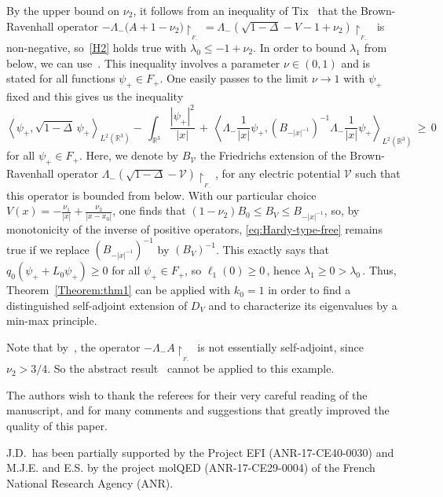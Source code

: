 \documentclass[12pt,reqno]{amsart}
\newcommand{\innerproduct}[2]{\left\langle #1, #2 \right\rangle}
\newcommand{\R}{{\mathbb R}}
\newcommand{\be}[1]{\begin{equation}\label{#1}}
\newcommand{\ee}{\end{equation}}
\renewcommand{\(}{\left(}
\renewcommand{\)}{\right)}
\begin{document}
By the upper bound on $\nu_2$, it follows from an inequality of Tix~\cite{MR1608118} that the Brown-Ravenhall operator $-\Lambda_- \big(A+1-\nu_2\big)\upharpoonright_{_{F_-}}=\Lambda_-(\sqrt{1-\Delta}-V-1+\nu_2)\upharpoonright_{_{F_-}}\,$ is non-negative, so~\eqref{H2} holds true with $\lambda_0\leq -1+\nu_2$. In order to bound $\lambda_1$ from below, we can use~\cite[inequality~(38)]{DES00a}. This inequality involves a parameter $\nu\in (0,1)$ and is stated for all functions $\psi_+\in F_+$. One easily passes to the limit $\nu\to 1$ with $\psi_+$ fixed and this gives us the inequality
\be{eq:Hardy-type-free}\innerproduct{\psi_+}{\sqrt{1-\Delta}\,\psi_+}_{L^2(\R^3)}-\,\int_{\R^3}\frac{|\psi_+|^2}{|x|}
\,+\,\innerproduct{\Lambda_-\frac{1}{|x|}\psi_+}{ \left(B_{-|x|^{-1}}\right)^{-1}\Lambda_-\frac{1}{|x|}\psi_+}_{L^2(\R^3)}\,\geq\,0
\ee
for all $\psi_+\in F_+$. Here, we denote by $B_{\mathcal V}$ the Friedrichs extension of the Brown-Ravenhall operator $\Lambda_-(\sqrt{1-\Delta}-\mathcal V)\upharpoonright_{_{F_-}}$, for any electric potential $\mathcal V$ such that this operator is bounded from below. With our particular choice $V(x)=-\frac{\nu_1}{|x|}+\frac{\nu_2}{|x-x_0|}$, one finds that $(1-\nu_2)B_0\leq B_{V}\leq B_{-|x|^{-1}}$, so, by monotonicity of the inverse of positive operators, \eqref{eq:Hardy-type-free} remains true if we replace $\left(B_{-|x|^{-1}}\right)^{-1}$ by $\left(B_{V}\right)^{-1}$. This exactly says that $q_0(\psi_++L_0\psi_+)\geq 0$ for all $\psi_+\in F_+$, so $\ell_1(0)\geq 0\,$, hence $\lambda_1\geq 0>\lambda_0\,$. Thus, Theorem~\ref{Theorem:thm1} can be applied with $k_0=1$ in order to find a distinguished self-adjoint extension of $D_V$ and to characterize its eigenvalues by a min-max principle.

Note that by~\cite[Corollary~3]{tix1997self}, the operator $-\Lambda_- A\upharpoonright_{_{F_-}}$ is not essentially self-adjoint, since $\nu_2 >3/4$. So the abstract result~\cite[Theorem 1.1]{SST20} cannot be applied to this example.



\medskip{} The authors wish to thank the referees for their very careful reading of the manuscript, and for many comments and suggestions that greatly improved the quality of this paper.\smallskip

\noindent J.D.~has been partially supported by the Project EFI (ANR-17-CE40-0030) and M.J.E. and E.S. by the project molQED (ANR-17-CE29-0004) of the French National Research Agency (ANR). \\
\end{document}
